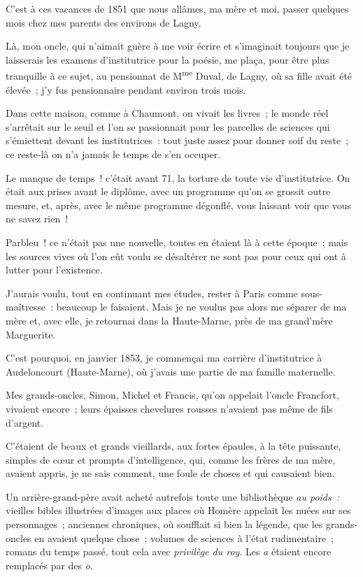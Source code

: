 \documentclass[french,twoside]{book} %
\begin{document}
C’est à ces vacances de 1851 que nous allâmes, ma mère et moi, passer quelques mois chez mes parents des environs de Lagny.\par
Là, mon oncle, qui n’aimait guère à me voir écrire et s’imaginait toujours que je laisserais les examens d’institutrice pour la poésie, me plaça, pour être plus tranquille à ce sujet, au pensionnat de M\textsuperscript{me} Duval, de Lagny, où sa fille avait été élevée ; j’y fus pensionnaire pendant environ trois mois.\par
Dans cette maison, comme à Chaumont, on vivait les livres ; le monde réel s’arrêtait sur le seuil et l’on se passionnait pour les parcelles de sciences qui s’émiettent devant les institutrices : tout juste assez pour donner soif du reste ; ce reste-là on n’a jamais le temps de s’en occuper.\par
Le manque de temps ! c’était avant 71, la torture de toute vie d’institutrice. On était aux prises avant le diplôme, avec un programme qu’on se grossit outre mesure, et, après, avec le même programme dégonflé, vous laissant voir que vous ne savez rien !\par
Parbleu ! ce n’était pas une nouvelle, toutes  en étaient là à cette époque ; mais les sources vives où l’on eût voulu se désaltérer ne sont pas pour ceux qui ont à lutter pour l’existence.\par
J’aurais voulu, tout en continuant mes études, rester à Paris comme sous-maîtresse : beaucoup le faisaient. Mais je ne voulus pas alors me séparer de ma mère et, avec elle, je retournai dans la Haute-Marne, près de ma grand’mère Marguerite.\par
C’est pourquoi, en janvier 1853, je commençai ma carrière d’institutrice à Audeloncourt (Haute-Marne), où j’avais une partie de ma famille maternelle.\par
Mes grands-oncles, Simon, Michel et Francis, qu’on appelait l’oncle Francfort, vivaient encore ; leurs épaisses chevelures rousses n’avaient pas même de fils d’argent.\par
C’étaient de beaux et grands vieillards, aux fortes épaules, à la tête puissante, simples de cœur et prompts d’intelligence, qui, comme les frères de ma mère, avaient appris, je ne sais comment, une foule de choses et qui causaient bien.\par
Un arrière-grand-père avait acheté autrefois toute une bibliothèque \emph{au poids :} vieilles bibles illustrées d’images aux places où Homère appelait les nuées sur ses personnages ; anciennes chroniques, où soufflait si bien la légende, que  les grands-oncles en avaient quelque chose ; volumes de sciences à l’état rudimentaire ; romans du temps passé, tout cela avec \emph{privilège du roy}. Les \emph{a} étaient encore remplacés par des \emph{o}.\par
\end{document}
